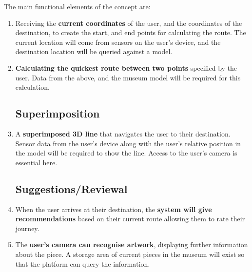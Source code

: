 
{
The main functional elements of the concept are:

\begin{enumerate}
\subsection*{Route Calculations}
    \item Receiving the \textbf{current coordinates} of the user, and the coordinates of the destination, to create the start, and end points for calculating the route. The current location will come from sensors on the user's device, and the destination location will be queried against a model.
    \item \textbf{Calculating the quickest route between two points} specified by the user. Data from the above, and the museum model will be required for this calculation.

\subsection*{Superimposition}
    \item A \textbf{superimposed 3D line} that navigates the user to their destination. Sensor data from the user's device along with the user's relative position in the model will be required to show the line. Access to the user's camera is essential here.

\subsection*{Suggestions/Reviewal}
    \item When the user arrives at their destination, the \textbf{system will give recommendations} based on their current route allowing them to rate their journey.
    \item The \textbf{user's camera can recognise artwork}, displaying further information about the piece. A storage area of current pieces in the museum will exist so that the platform can query the information.
\end{enumerate}

}